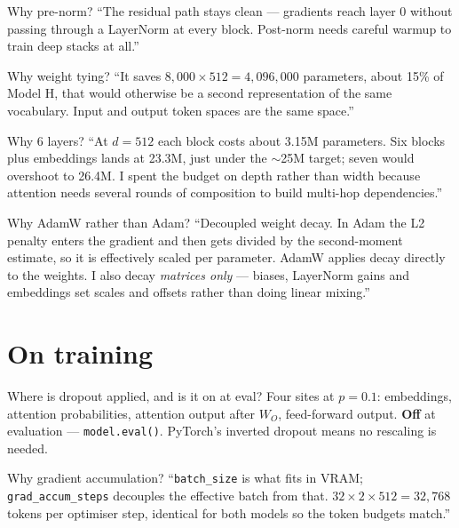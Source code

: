 \documentclass[11pt]{report}
\newcommand{\p}[1]{\texttt{#1}}
\begin{document}
\begin{qabox}{Why pre-norm?}
``The residual path stays clean --- gradients reach layer 0 without passing
through a LayerNorm at every block. Post-norm needs careful warmup to train deep
stacks at all.''
\end{qabox}

\begin{qabox}{Why weight tying?}
``It saves $8{,}000 \times 512 = 4{,}096{,}000$ parameters, about 15\% of Model
H, that would otherwise be a second representation of the same vocabulary. Input
and output token spaces are the same space.''
\end{qabox}

\begin{qabox}{Why 6 layers?}
``At $d = 512$ each block costs about 3.15M parameters. Six blocks plus
embeddings lands at 23.3M, just under the $\sim$25M target; seven would overshoot
to 26.4M. I spent the budget on depth rather than width because attention needs
several rounds of composition to build multi-hop dependencies.''
\end{qabox}

\begin{qabox}{Why AdamW rather than Adam?}
``Decoupled weight decay. In Adam the L2 penalty enters the gradient and then
gets divided by the second-moment estimate, so it is effectively scaled per
parameter. AdamW applies decay directly to the weights. I also decay
\emph{matrices only} --- biases, LayerNorm gains and embeddings set scales and
offsets rather than doing linear mixing.''
\end{qabox}

\section{On training}

\begin{qabox}{Where is dropout applied, and is it on at eval?}
Four sites at $p=0.1$: embeddings, attention probabilities, attention output
after $W_O$, feed-forward output. \textbf{Off} at evaluation ---
\p{model.eval()}. PyTorch's inverted dropout means no rescaling is needed.
\end{qabox}

\begin{qabox}{Why gradient accumulation?}
``\p{batch\_size} is what fits in VRAM; \p{grad\_accum\_steps} decouples the
effective batch from that. $32 \times 2 \times 512 = 32{,}768$ tokens per
optimiser step, identical for both models so the token budgets match.''
\end{qabox}
\end{document}
